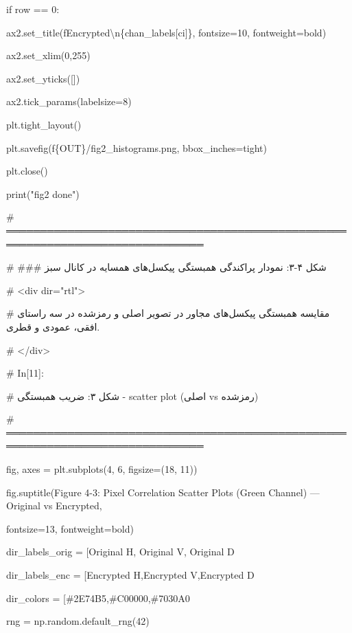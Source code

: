 if row == 0:

ax2.set\_title(f\textquotesingle Encrypted\textbackslash n\{chan\_labels{[}ci{]}\}\textquotesingle, fontsize=10, fontweight=\textquotesingle bold\textquotesingle)

ax2.set\_xlim(0,255)

ax2.set\_yticks({[}{]})

ax2.tick\_params(labelsize=8)

plt.tight\_layout()

plt.savefig(f\textquotesingle\{OUT\}/fig2\_histograms.png\textquotesingle, bbox\_inches=\textquotesingle tight\textquotesingle)

plt.close()

print("fig2 done")

\# ═══════════════════════════════════════════════════════════════════════════════

\# \#\#\# شکل ۴-۳: نمودار پراکندگی همبستگی پیکسل‌های همسایه در کانال سبز

\# \textless div dir="rtl"\textgreater{}

\# مقایسه همبستگی پیکسل‌های مجاور در تصویر اصلی و رمزشده در سه راستای افقی، عمودی و قطری.

\# \textless/div\textgreater{}

\# In{[}11{]}:

\# شکل ۳: ضریب همبستگی - scatter plot (اصلی vs رمزشده)

\# ═══════════════════════════════════════════════════════════════════════════════

fig, axes = plt.subplots(4, 6, figsize=(18, 11))

fig.suptitle(\textquotesingle Figure 4-3: Pixel Correlation Scatter Plots (Green Channel) --- Original vs Encrypted\textquotesingle,

fontsize=13, fontweight=\textquotesingle bold\textquotesingle)

dir\_labels\_orig = {[}\textquotesingle Original H\textquotesingle, \textquotesingle Original V\textquotesingle, \textquotesingle Original D\textquotesingle{]}

dir\_labels\_enc = {[}\textquotesingle Encrypted H\textquotesingle,\textquotesingle Encrypted V\textquotesingle,\textquotesingle Encrypted D\textquotesingle{]}

dir\_colors = {[}\textquotesingle\#2E74B5\textquotesingle,\textquotesingle\#C00000\textquotesingle,\textquotesingle\#7030A0\textquotesingle{]}

rng = np.random.default\_rng(42)

